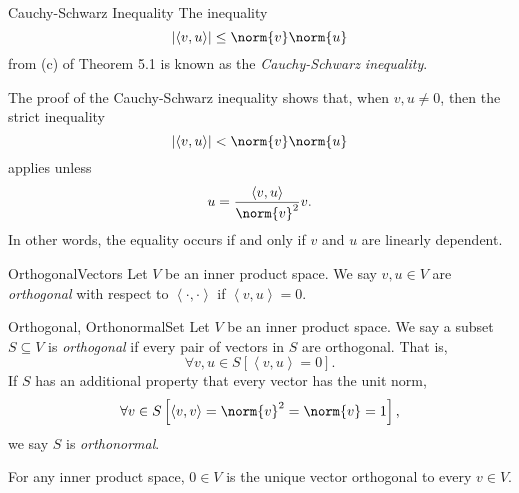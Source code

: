 \documentclass[linearalgebraII]{subfiles}
\begin{document}
    \begin{definition}{Cauchy-Schwarz Inequality}{}
        The inequality
        \begin{equation*}
            \left| \left\langle v, u\right\rangle  \right| \leq \norm{v}\norm{u}
        \end{equation*}
        from (c) of Theorem 5.1 is known as the \emph{Cauchy-Schwarz inequality}.
    \end{definition}

    \begin{remark}
        The proof of the Cauchy-Schwarz inequality shows that, when $v,u\neq 0$, then the strict inequality
        \begin{equation*}
            \left| \left\langle v, u\right\rangle  \right| < \norm{v}\norm{u}
        \end{equation*}
        applies unless
        \begin{equation*}
            u = \frac{\left\langle v, u\right\rangle }{\norm{v}^2} v.
        \end{equation*}
        In other words, the equality occurs if and only if $v$ and $u$ are linearly dependent.
    \end{remark}

    \begin{definition}{Orthogonal}{Vectors}
        Let $V$ be an inner product space. We say $v,u\in V$ are \emph{orthogonal} with respect to $\left\langle \cdot, \cdot\right\rangle$ if $\left\langle v, u\right\rangle = 0$.
    \end{definition}

    \begin{definition}{Orthogonal, Orthonormal}{Set}
        Let $V$ be an inner product space. We say a subset $S\subseteq V$ is \emph{orthogonal} if every pair of vectors in $S$ are orthogonal. That is,
        \begin{equation*}
            \forall v,u\in S \left[ \left\langle v, u\right\rangle = 0 \right] .
        \end{equation*}
        If $S$ has an additional property that every vector has the unit norm,
        \begin{equation*}
            \forall v\in S \left[ \left\langle v, v\right\rangle = \norm{v}^2 = \norm{v} = 1 \right] ,
        \end{equation*}
        we say $S$ is \emph{orthonormal}.
    \end{definition}

    \begin{example}
        For any inner product space, $0\in V$ is the unique vector orthogonal to every $v\in V$.
    \end{example}
\end{document}
